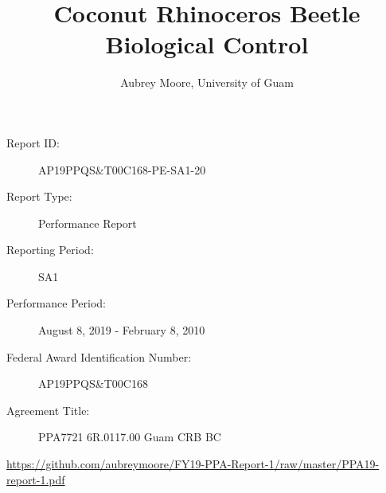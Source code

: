 \documentclass[12pt,
letterpaper,english,bibliography=totocnumbered, abstract=on]{scrartcl}
\begin{document}
\titlehead{USDA-APHIS Progress Report}
\title{Coconut Rhinoceros Beetle Biological Control}
\author{Aubrey Moore, University of Guam}
\maketitle
\begin{description}	
	\item[Report ID:] AP19PPQS\&T00C168-PE-SA1-20
	\item[Report Type:] Performance Report
	\item[Reporting Period:]  SA1
	\item[Performance Period:] August 8, 2019 - February 8, 2010
\item[Federal Award Identification Number:] AP19PPQS\&T00C168
\item[Agreement Title:] PPA7721 6R.0117.00 Guam CRB BC
\end{description}

\begin{footnotesize}
\url{https://github.com/aubreymoore/FY19-PPA-Report-1/raw/master/PPA19-report-1.pdf}
\end{footnotesize}

\newpage{}
\end{document}
